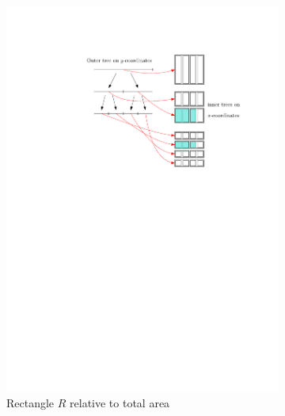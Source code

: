 \documentclass[english,gradu]{tktltiki2018}
\begin{document}
\begin{figure}\centering
	\begin{subfigure}[t]{0.15\textwidth}\centering
		\includegraphics[width=\textwidth,page=2]{fig/segtree2d}
		\caption{Rectangle $R$ relative to total area}\label{fig:canon2d:r}
	\end{subfigure}
	\hfil
	\begin{subfigure}[t]{0.75\textwidth}\centering

\end{subfigure}
\end{figure}
\end{document}

